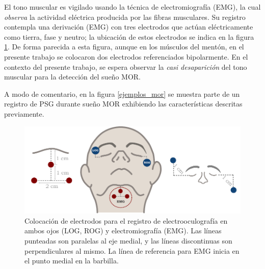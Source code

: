 \documentclass[12pt,letterpaper]{book}
\begin{document}
El tono muscular es vigilado usando la técnica de electromiografía (EMG), la cual \textit{observa} la actividad eléctrica producida por las fibras musculares.
%
Su registro contempla 
una derivación (EMG) con tres electrodos que actúan eléctricamente como tierra, fase y neutro;
%
la ubicación de estos electrodos se indica en la figura \ref{emg_eog}. De forma parecida a esta figura, aunque en los músculos del mentón, en el presente trabajo se colocaron dos electrodos referenciados bipolarmente.  
%
En el contexto del presente trabajo, se espera observar la \textit{casi desaparición} del tono muscular para la detección del sueño MOR.
%
%

A modo de comentario, en la figura \ref{ejemplos_mor} se muestra parte de un registro de PSG durante sueño MOR exhibiendo las características descritas previamente.

\begin{figure}
\centering
\includegraphics[width=\linewidth]
{./img_diagramas/emg_eog_v4.pdf}
\caption[Colocación de electrodos para el registro de electrooculograma y electromiograma]{Colocación de electrodos para el registro de electrooculografía en ambos ojos (LOG, ROG) y electromiografía (EMG). Las líneas punteadas son paralelas al eje medial, y las líneas discontinuas son perpendiculares al mismo. La línea de referencia para EMG inicia en el punto medial en la barbilla.}
\label{emg_eog}
\end{figure}
\end{document}

